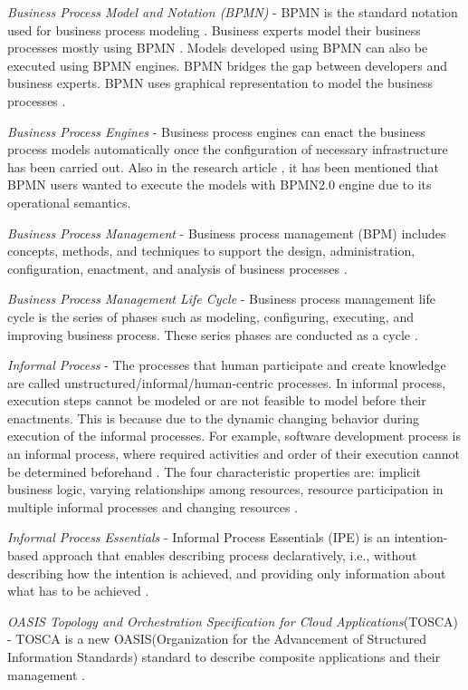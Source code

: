 \textit{Business Process Model and Notation (BPMN)} - BPMN is the standard notation used for business process modeling \cite{Recker2010}. Business experts model their business processes mostly using BPMN \cite{SAP2009}. Models developed using BPMN can also be executed using BPMN engines. BPMN bridges the gap between developers and business experts. BPMN uses graphical representation to model the business processes \cite{Leymann2010}.   

\textit{Business Process Engines} - Business process engines can enact the business process models automatically once the configuration of necessary infrastructure has been carried out. Also in the research article \cite{Leymann2010}, it has been mentioned that BPMN users wanted to execute the models with BPMN2.0 engine due to its operational semantics.

\textit{Business Process Management} - Business process management (BPM) includes concepts, methods, and techniques to support the design, administration, configuration, enactment, and analysis of business processes \cite{Weske2012}.

\textit{Business Process Management Life Cycle} - Business process management life cycle is the series of phases such as modeling, configuring, executing, and improving business process. These series phases are conducted as a cycle \cite{Weske2012}.

\textit{Informal Process} - The processes that human participate and create knowledge are called unstructured/informal/human-centric processes. In informal process, execution steps cannot be modeled or are not feasible to model before their enactments. This is because due to the dynamic changing behavior during execution of the informal processes.  For example, software development process is an informal process, where required activities and order of their execution cannot be determined beforehand \cite{Sungur2015}. The four characteristic properties are: implicit business logic, varying relationships among resources, resource participation in multiple informal processes and changing resources \cite{Sungur2014a}.    

\textit{Informal Process Essentials} - Informal Process Essentials (IPE) is an intention-based approach that enables describing process declaratively, i.e., without describing how the intention is achieved, and providing only information about what has to be achieved \cite{Sungur2014a}. 

\textit{OASIS Topology and Orchestration Specification for Cloud Applications}(TOSCA) - TOSCA  is  a  new  OASIS(Organization for the Advancement of Structured Information Standards)  standard  to  describe  composite applications  and  their  management \cite{Kopp2013}.  


